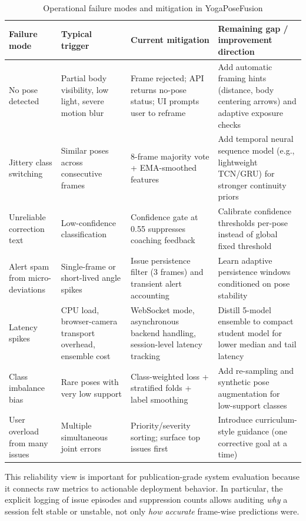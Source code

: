 \documentclass[conference]{IEEEtran}
\begin{document}
\begin{table}[t]
\caption{Operational failure modes and mitigation in YogaPoseFusion}
\label{tab:failure_modes}
\centering
\begin{tabular}{p{}p{}p{}p{}}
\toprule
Failure mode & Typical trigger & Current mitigation & Remaining gap / improvement direction \\
\midrule
No pose detected & Partial body visibility, low light, severe motion blur & Frame rejected; API returns no-pose status; UI prompts user to reframe & Add automatic framing hints (distance, body centering arrows) and adaptive exposure checks \\
\addlinespace
Jittery class switching & Similar poses across consecutive frames & 8-frame majority vote + EMA-smoothed features & Add temporal neural sequence model (e.g., lightweight TCN/GRU) for stronger continuity priors \\
\addlinespace
Unreliable correction text & Low-confidence classification & Confidence gate at 0.55 suppresses coaching feedback & Calibrate confidence thresholds per-pose instead of global fixed threshold \\
\addlinespace
Alert spam from micro-deviations & Single-frame or short-lived angle spikes & Issue persistence filter (3 frames) and transient alert accounting & Learn adaptive persistence windows conditioned on pose stability \\
\addlinespace
Latency spikes & CPU load, browser-camera transport overhead, ensemble cost & WebSocket mode, asynchronous backend handling, session-level latency tracking & Distill 5-model ensemble to compact student model for lower median and tail latency \\
\addlinespace
Class imbalance bias & Rare poses with very low support & Class-weighted loss + stratified folds + label smoothing & Add re-sampling and synthetic pose augmentation for low-support classes \\
\addlinespace
User overload from many issues & Multiple simultaneous joint errors & Priority/severity sorting; surface top issues first & Introduce curriculum-style guidance (one corrective goal at a time) \\
\bottomrule
\end{tabular}
\end{table}

This reliability view is important for publication-grade system evaluation because it connects raw metrics to actionable deployment behavior. In particular, the explicit logging of issue episodes and suppression counts allows auditing \emph{why} a session felt stable or unstable, not only \emph{how accurate} frame-wise predictions were.
\end{document}
